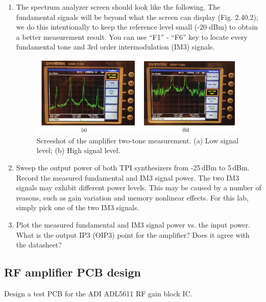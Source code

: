 \documentclass[letterpaper, 11pt]{article}
\begin{document}
\begin{enumerate}
	\item The spectrum analyzer screen should look like the following. The fundamental signals will be beyond what the screen can display (Fig. 2.40.2); we do this intentionally to keep the reference level small (-20 dBm) to obtain a better measurement result. You can use ``F1'' - ``F6'' key to locate every fundamental tone and 3rd order intermodulation (IM3) signals. 
		\begin{figure}[h]
			\centering
			\includegraphics[width=4.5in]{sa-two-tone-amp}
			\caption{Screeshot of the amplifier two-tone measurement. (a) Low signal level; (b) High signal level.}
			\label{fig:sa-two-tone-amp}
		\end{figure}
	\item Sweep the output power of both TPI synthesizers from -25\,dBm to 5\,dBm. Record the measured fundamental and IM3 signal power. The two IM3 signals may exhibit different power levels. This may be caused by a number of reasons, such as gain variation and memory nonlinear effects. For this lab, simply pick one of the two IM3 signals.
	
	\item Plot the measured fundamental and IM3 signal power vs. the input power. What is the output IP3 (OIP3) point for the amplifier? Does it agree with the datasheet?

\end{enumerate}


\subsection{RF amplifier PCB design}
Design a test PCB for the ADI ADL5611 RF gain block IC. 
\end{document}
